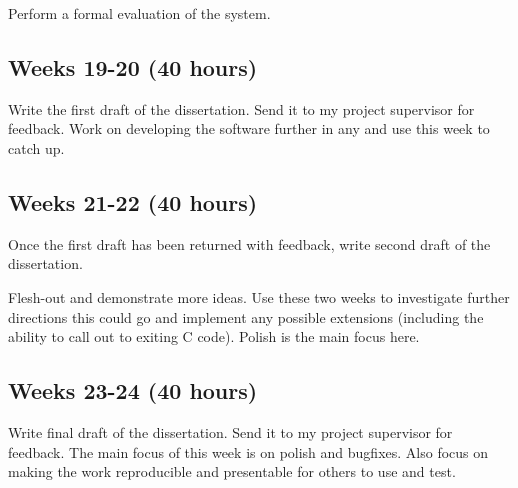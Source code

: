 \documentclass[11pt]{article}
\begin{document}
Perform a formal evaluation of the system.

\subsection{Weeks 19-20 (40 hours)}

Write the first draft of the dissertation. Send it to my project supervisor for
feedback. Work on developing the software further in any and use this week to
catch up.

\subsection{Weeks 21-22 (40 hours)}

Once the first draft has been returned with feedback, write second draft of the
dissertation.

Flesh-out and demonstrate more ideas. Use these two weeks to investigate
further directions this could go and implement any possible extensions
(including the ability to call out to exiting C code). Polish is the main focus
here.

\subsection{Weeks 23-24 (40 hours)}

Write final draft of the dissertation. Send it to my project supervisor for
feedback. The main focus of this week is on polish and bugfixes. Also focus on
making the work reproducible and presentable for others to use and test.


\end{document}
